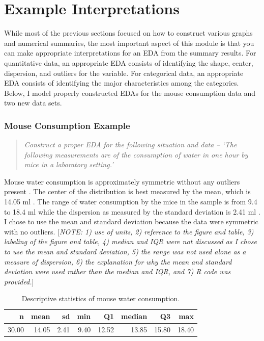\documentclass[10pt,openany]{book}\usepackage[]{graphicx}\usepackage[]{color}
\begin{document}
\section{Example Interpretations}
\vspace{-12pt}
While most of the previous sections focused on how to construct various graphs and numerical summaries, the most important aspect of this module is that you can make appropriate interpretations for an EDA from the summary results.  For quantitative data, an appropriate EDA consists of identifying the shape, center, dispersion, and outliers for the variable.  For categorical data, an appropriate EDA consists of identifying the major characteristics among the categories.  Below, I model properly constructed EDAs for the mouse consumption data and two new data sets.

\subsubsection{Mouse Consumption Example}
\vspace{-12pt}
\begin{quote}
\textit{Construct a proper EDA for the following situation and data -- `The  following measurements  are of the consumption of water in one hour by mice in a laboratory setting.'}
\end{quote}
\vspace{-12pt}


Mouse water consumption is approximately symmetric without any outliers present .  The center of the distribution is best measured by the mean, which is 14.05 ml .  The range of water consumption by the mice in the sample is from 9.4 to 18.4 ml while the dispersion as measured by the standard deviation is 2.41 ml .  I chose to use the mean and standard deviation because the data were symmetric with no outliers.  [\textit{NOTE: 1) use of units, 2) reference to the figure and table, 3) labeling of the figure and table, 4) median and IQR were not discussed as I chose to use the mean and standard deviation, 5) the range was not used alone as a measure of dispersion, 6) the explanation for why the mean and standard deviation were used rather than the median and IQR, and 7) R code was provided.}]

\begin{table}[ht]
\centering
\caption{Descriptive statistics of mouse water consumption.} 
\label{tab:MouseStats}
\begin{tabular}{rrrrrrrr}
  \hline
n & mean & sd & min & Q1 & median & Q3 & max \\ 
  \hline
30.00 & 14.05 & 2.41 & 9.40 & 12.52 & 13.85 & 15.80 & 18.40 \\ 
   \hline
\end{tabular}
\end{table}
\end{document}
